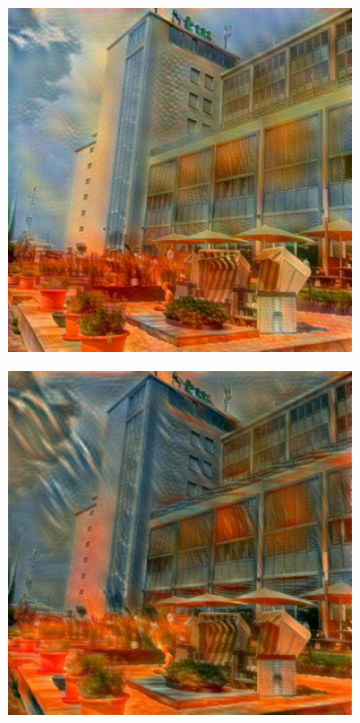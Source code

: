 \begin{figure}[H]
    \centering
    \begin{subfigure}[h]{0.3\textwidth}
        \centering
        \includegraphics[width=\textwidth]{resources/content/output/neural-style/htw-test-2-1.jpg}
    \end{subfigure}
    \begin{subfigure}[h]{0.3\textwidth}
        \centering
        \includegraphics[width=\textwidth]{resources/content/output/neural-style/htw-test-2-2.jpg}

\end{subfigure}
\end{figure}
